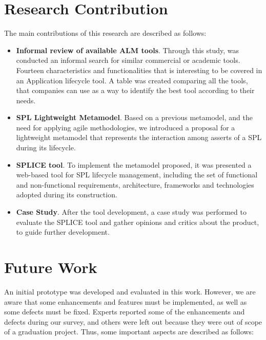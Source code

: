 \section{Research Contribution}
\label{sc:reserach-contrib}
The main contributions of this research are described as follows:
\begin{itemize}
\item  \textbf{Informal review of available \ac{ALM} tools}. Through this study, was conducted an informal search for similar commercial or academic tools. Fourteen characteristics and functionalities that is interesting to be covered in an Application lifecycle tool.  A table was created comparing all the tools, that companies can use as a way to identify the best tool according to their needs.

\item  \textbf{ SPL Lightweight Metamodel}. Based on a previous metamodel, and the need for applying agile methodologies, we introduced a proposal for a lightweight metamodel that represents the interaction among asserts of a \ac{SPL} during its lifecycle.
\item  \textbf{ SPLICE tool}. To implement the metamodel proposed, it was presented a web-based tool for \ac{SPL} lifecycle management, including the set of functional and non-functional requirements, architecture, frameworks and technologies adopted during its construction.
\item  \textbf{Case Study}. After the tool development, a case study was performed to evaluate the \ac{SPLICE} tool and gather opinions and critics about the product, to guide further development.

\end{itemize}

\section{Future Work}
\label{sc:future-work}
An initial prototype was developed and evaluated in this work. However, we are aware that some enhancements and features must be implemented, as well as some defects must be fixed. Experts reported some of the enhancements and defects during our survey, and others were left out because they were out of scope of a graduation project. Thus, some important aspects are described as follows:

